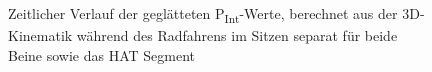 \documentclass[
  letterpaper,
  DIV=11]{scrartcl}
\begin{document}
\begin{figure}


\caption{\label{fig-PInt_Kinematik_HAT_Pint_sitzen}Zeitlicher Verlauf
der geglätteten P\textsubscript{Int}-Werte, berechnet aus der
3D-Kinematik während des Radfahrens im Sitzen separat für beide Beine
sowie das HAT Segment}

\end{figure}%
\end{document}
